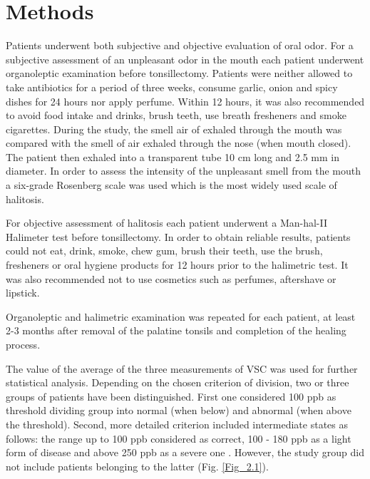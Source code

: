 \documentclass[12pt,a4paper,notitlepage]{report}
\begin{document}
\section{Methods}

Patients underwent both subjective and objective evaluation of oral odor. 
For a subjective assessment of an unpleasant odor in the mouth each patient underwent organoleptic examination before tonsillectomy. Patients were neither allowed to take antibiotics for a period of three weeks, consume garlic, onion and spicy dishes for 24 hours nor apply perfume. Within 12 hours, it was also recommended to avoid food intake and drinks, brush teeth, use breath fresheners and smoke cigarettes. During the study, the smell air of exhaled through the mouth was compared with the smell of air exhaled through the nose (when mouth closed). The patient then exhaled into a transparent tube 10 cm long and 2.5 mm in diameter. In order to assess the intensity of the unpleasant smell from the mouth a six-grade Rosenberg scale was used which is the most widely used scale of halitosis. \

For objective assessment of halitosis each patient underwent a Man-hal-II Halimeter test before tonsillectomy. In order to obtain reliable results, patients could not eat, drink, smoke, chew gum, brush their teeth, use the brush, fresheners or oral hygiene products for 12 hours prior to the halimetric test. It was also recommended not to use cosmetics such as perfumes, aftershave or lipstick. \

Organoleptic and halimetric examination was repeated for each patient, at least 2-3 months after removal of the palatine tonsils and completion of the healing process.

The value of the average of the three measurements of VSC was used for further statistical analysis. Depending on the chosen criterion of division, two or three groups of patients have been distinguished. First one considered 100 ppb as threshold dividing group into normal (when below) and abnormal (when above the threshold). Second, more detailed criterion included intermediate states as follows: the range up to 100 ppb considered as correct, 100 - 180 ppb as a light form of disease and above 250 ppb as a severe one \cite{Lee04}. However, the study group did not include patients belonging to the latter (Fig. \ref{Fig_2.1}).  
\end{document}
